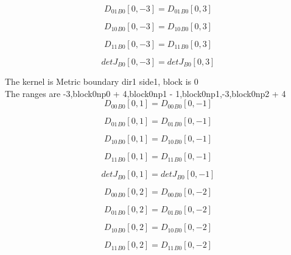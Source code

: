 \documentclass{article}
\begin{document}
\begin{dmath}{D_{01}{_{B0}}}[{0,-3}] = {D_{01}{_{B0}}}[{0,3}]\end{dmath}

\begin{dmath}{D_{10}{_{B0}}}[{0,-3}] = {D_{10}{_{B0}}}[{0,3}]\end{dmath}

\begin{dmath}{D_{11}{_{B0}}}[{0,-3}] = {D_{11}{_{B0}}}[{0,3}]\end{dmath}

\begin{dmath}{detJ{_{B0}}}[{0,-3}] = {detJ{_{B0}}}[{0,3}]\end{dmath}

\noindent The kernel is Metric boundary dir1 side1, block is 0\\\noindent The ranges are -3,block0np0 + 4,block0np1 - 1,block0np1,-3,block0np2 + 4\\\begin{dmath}{D_{00}{_{B0}}}[{0,1}] = {D_{00}{_{B0}}}[{0,-1}]\end{dmath}

\begin{dmath}{D_{01}{_{B0}}}[{0,1}] = {D_{01}{_{B0}}}[{0,-1}]\end{dmath}

\begin{dmath}{D_{10}{_{B0}}}[{0,1}] = {D_{10}{_{B0}}}[{0,-1}]\end{dmath}

\begin{dmath}{D_{11}{_{B0}}}[{0,1}] = {D_{11}{_{B0}}}[{0,-1}]\end{dmath}

\begin{dmath}{detJ{_{B0}}}[{0,1}] = {detJ{_{B0}}}[{0,-1}]\end{dmath}

\begin{dmath}{D_{00}{_{B0}}}[{0,2}] = {D_{00}{_{B0}}}[{0,-2}]\end{dmath}

\begin{dmath}{D_{01}{_{B0}}}[{0,2}] = {D_{01}{_{B0}}}[{0,-2}]\end{dmath}

\begin{dmath}{D_{10}{_{B0}}}[{0,2}] = {D_{10}{_{B0}}}[{0,-2}]\end{dmath}

\begin{dmath}{D_{11}{_{B0}}}[{0,2}] = {D_{11}{_{B0}}}[{0,-2}]\end{dmath}
\end{document}
